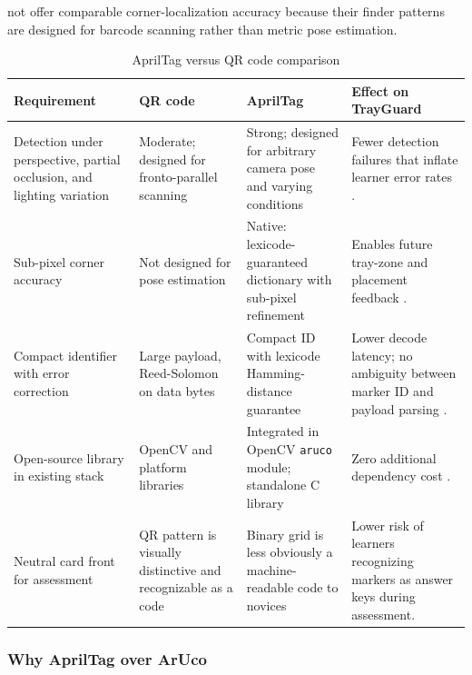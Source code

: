 \documentclass[10pt,a4paper]{article}
\begin{document}
not offer comparable corner-localization accuracy because their finder patterns
are designed for barcode scanning rather than metric pose estimation.
\begin{table}[H]
\centering
\caption{AprilTag versus QR code comparison}
\label{tab:apriltag-versus-qr-code-comparison}
\small\renewcommand{\arraystretch}{1.2}\setlength{\tabcolsep}{4pt}
\begin{tabularx}{\textwidth}{|>{\raggedright\arraybackslash}X|>{\raggedright\arraybackslash}X|>{\raggedright\arraybackslash}X|>{\raggedright\arraybackslash}X|}
\hline
Requirement & QR code & AprilTag & Effect on TrayGuard \\
\hline
Detection under perspective, partial occlusion, and lighting variation & Moderate; designed for fronto-parallel scanning & Strong; designed for arbitrary camera pose and varying conditions & Fewer detection failures that inflate learner error rates \cite{kalaitzakis-et-al-2021}. \\
\hline
Sub-pixel corner accuracy & Not designed for pose estimation & Native: lexicode-guaranteed dictionary with sub-pixel refinement & Enables future tray-zone and placement feedback \cite{romero-ramirez-et-al-2018}. \\
\hline
Compact identifier with error correction & Large payload, Reed-Solomon on data bytes & Compact ID with lexicode Hamming-distance guarantee & Lower decode latency; no ambiguity between marker ID and payload parsing \cite{olson-2011}. \\
\hline
Open-source library in existing stack & OpenCV and platform libraries & Integrated in OpenCV \texttt{aruco} module; standalone C library & Zero additional dependency cost \cite{opencv-aruco-detection-accessed-2026}. \\
\hline
Neutral card front for assessment & QR pattern is visually distinctive and recognizable as a code & Binary grid is less obviously a machine-readable code to novices & Lower risk of learners recognizing markers as answer keys during assessment. \\
\hline
\end{tabularx}
\end{table}
\subsubsection{Why AprilTag over ArUco}
\end{document}
